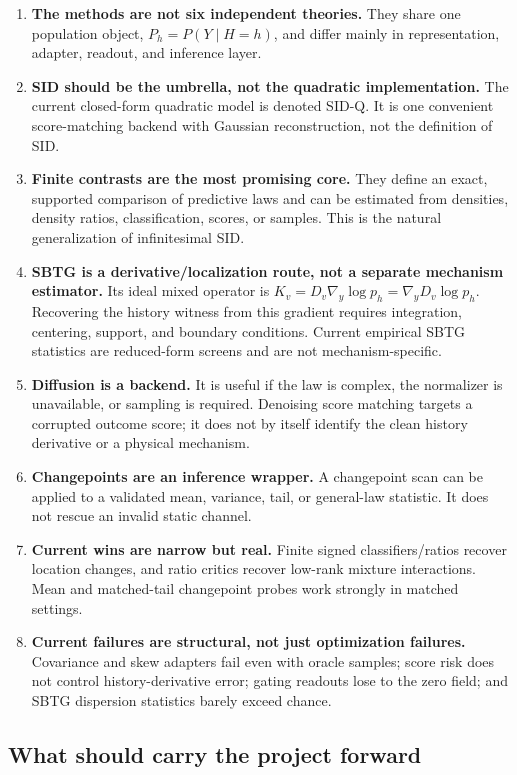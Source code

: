 \documentclass[10pt]{article}
\newcommand{\SIDQ}{\textnormal{\textsc{SID-Q}}\xspace}
\begin{document}
\begin{enumerate}
  \item \textbf{The methods are not six independent theories.} They share one population object, \(P_h=P(Y\mid H=h)\), and differ mainly in representation, adapter, readout, and inference layer.
  \item \textbf{SID should be the umbrella, not the quadratic implementation.} The current closed-form quadratic model is denoted \SIDQ. It is one convenient score-matching backend with Gaussian reconstruction, not the definition of SID.
  \item \textbf{Finite contrasts are the most promising core.} They define an exact, supported comparison of predictive laws and can be estimated from densities, density ratios, classification, scores, or samples. This is the natural generalization of infinitesimal SID.
  \item \textbf{SBTG is a derivative/localization route, not a separate mechanism estimator.} Its ideal mixed operator is \(K_v=D_v\nabla_y\log p_h=\nabla_y D_v\log p_h\). Recovering the history witness from this gradient requires integration, centering, support, and boundary conditions. Current empirical SBTG statistics are reduced-form screens and are not mechanism-specific.
  \item \textbf{Diffusion is a backend.} It is useful if the law is complex, the normalizer is unavailable, or sampling is required. Denoising score matching targets a corrupted outcome score; it does not by itself identify the clean history derivative or a physical mechanism.
  \item \textbf{Changepoints are an inference wrapper.} A changepoint scan can be applied to a validated mean, variance, tail, or general-law statistic. It does not rescue an invalid static channel.
  \item \textbf{Current wins are narrow but real.} Finite signed classifiers/ratios recover location changes, and ratio critics recover low-rank mixture interactions. Mean and matched-tail changepoint probes work strongly in matched settings.
  \item \textbf{Current failures are structural, not just optimization failures.} Covariance and skew adapters fail even with oracle samples; score risk does not control history-derivative error; gating readouts lose to the zero field; and SBTG dispersion statistics barely exceed chance.
\end{enumerate}

\subsection{What should carry the project forward}
\end{document}
